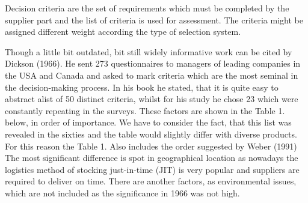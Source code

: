 \documentclass[oneside,12pt]{article}%
\begin{document}
Decision criteria are the set of requirements which must be completed by the supplier part and the list of criteria is used for assessment. The criteria might be assigned different weight according the type of selection system. \par
Though a little bit outdated, bit still widely informative work can be cited by Dickson (1966). He sent 273 questionnaires to managers of leading companies in the USA and Canada and asked to mark criteria which are the most seminal in the decision-making process. In his book he stated, that it is quite easy to abstract alist of 50 distinct criteria, whilst for his study he chose 23 which were constantly repeating in the surveys. These factors are shown in the Table 1. below, in order of importance. We have to consider the fact, that this list was revealed in the sixties and the table would slightly differ with diverse products. For this reason the Table 1. Also includes the order suggested by Weber (1991) The most significant difference is spot in geographical location as nowadays the logistics method of stocking just-in-time (JIT) is very popular and suppliers are required to deliver on time. There are another factors, as environmental issues, which are not included as the significance in 1966 was not high.
\end{document}
